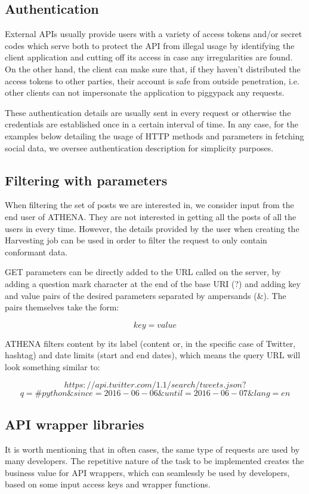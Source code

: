 \documentclass[12pt,a4paper,twoside]{report}
\begin{document}
\subsection{Authentication}
External APIs usually provide users with a variety of access tokens and/or secret codes which serve both to protect the API from illegal usage by identifying the client application and cutting off its access in case any irregularities are found. On the other hand, the client can make sure that, if they haven't distributed the access tokens to other parties, their account is safe from outside penetration, i.e. other clients can not impersonate the application to piggypack any requests.

These authentication details are usually sent in every request or otherwise the credentials are established once in a certain interval of time. In any case, for the examples below detailing the usage of HTTP methods and parameters in fetching social data, we oversee authentication description for simplicity purposes.

\subsection{Filtering with parameters}
When filtering the set of posts we are interested in, we consider input from the end user of ATHENA. They are not interested in getting all the posts of all the users in every time. However, the details provided by the user when creating the Harvesting job can be used in order to filter the request to only contain conformant data.

GET parameters can be directly added to the URL called on the server, by adding a question mark character at the end of the base URI (?) and adding key and value pairs of the desired parameters separated by ampersands (\&). The pairs themselves take the form:

\[key=value\]

ATHENA filters content by its label (content or, in the specific case of Twitter, hashtag) and date limits (start and end dates), which means the query URL will look something similar to:

\[https://api.twitter.com/1.1/search/tweets.json?\]
\[q=\#python\&since=2016-06-06\&until=2016-06-07\&lang=en\]

\subsection{API wrapper libraries}
It is worth mentioning that in often cases, the same type of requests are used by many developers. The repetitive nature of the task to be implemented creates the business value for API wrappers, which can seamlessly be used by developers, based on some input access keys and wrapper functions.
\end{document}
